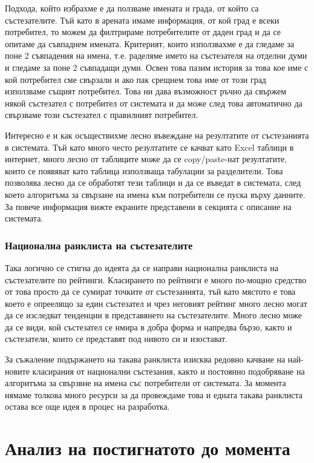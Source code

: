 \documentclass[a4paper,12pt]{article}
\begin{document}
    Подхода, който избрахме е да ползваме имената и града, от който са състезателите. Тъй като в арената имаме информация, от кой град е всеки потребител, то можем да филтрираме потребителите от даден град и да се опитаме да съвпаднем имената. Критерият, които използвахме е да гледаме за поне 2 съвпадения на имена, т.е. раделяме името на състезателя на отделни думи и гледаме за поне 2 съвпадащи думи. Освен това пазим история за това кое име с кой потребител сме свързали и ако пак срещнем това име от този град използваме същият потребител. Това ни дава възможност ръчно да свържем някой състезател с потребител от системата и да може след това автоматично да свързваме този състезател с правилният потребител.
    
    Интересно е и как осъществихме лесно въвеждане на резултатите от състезанията в системата. Тъй като много често резултатите се качват като Excel таблици в интернет, много лесно от таблиците може да се copy/paste-нат резултатите, които се появяват като таблица използваща табулации за разделители. Това позволява лесно да се обработят тези таблици и да се въведат в системата, след което алгоритъма за свързане на имена към потребители се пуска върху данните. За повече информация вижте екраните представени в секцията с описание на системата.
  \subsubsection{Национална ранклиста на състезателите}       
  Така логично се стигна до идеята да се направи национална ранклиста на състезателите по рейтинги. Класирането по рейтинги е много по-мощно средство от това просто да се сумират точките от състезанията, тъй като мястото е това което е опреелящо за един състезател и чрез неговият рейтинг много лесно могат да се изследват тенденции в представянето на състезателите. Много лесно може да се види, кой състезател се нмира в добра форма и напредва бързо, както и състезатели, които се представят под нивото си и изостават.
  
  За съжаление подържането на такава ранклиста изисква редовно качване на най-новите класирания от национални състезания, както и постоянно подобряване на алгоритъма за свързвне на имена със потребители от системата. За момента нямаме толкова много ресурси за да провеждаме това и едната такава ранклиста остава все още идея в процес на разработка.
  \section{Анализ на постигнатото до момента}
\end{document}
